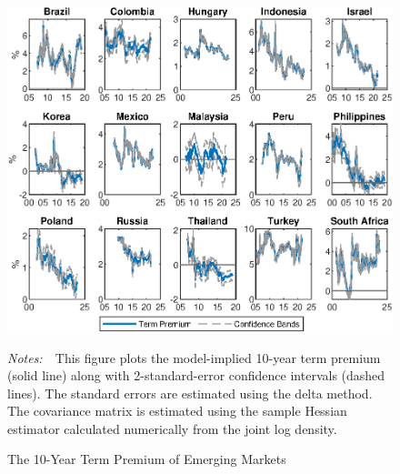 \documentclass[a4paper, 12pt]{article}
\newcommand{\figtext}[1]{
	\vspace{-1ex}
	\captionsetup{justification=justified,font=footnotesize}
	\caption*{#1}
}
\newcommand{\fignotes}[1]{\figtext{\emph{Notes:~}~#1}}
\begin{document}
\begin{appendices}
	\begin{landscape}
		\begin{figure}[tbph]
			\caption{The 10-Year Term Premium of Emerging Markets} \label{fig:bsl_tp_CI_10y_V1}
			\begin{center}								%
				\begin{minipage}{0.9\linewidth}
					\begin{center}							%
						\includegraphics[trim={0cm 0cm 0cm 0cm},clip,height=0.8\textheight,width=\linewidth]{../Figures/bsl_tp_CI_10y_V1.eps} \\
					\end{center}
					\fignotes{This figure plots the model-implied 10-year term premium (solid line) along with 2-standard-error confidence intervals (dashed lines). The standard errors are estimated using the delta method. The covariance matrix is estimated using the sample Hessian estimator calculated numerically from the joint log density.}
				\end{minipage}
			\end{center}
		\end{figure}
		

\end{landscape}
\end{appendices}
\end{document}
